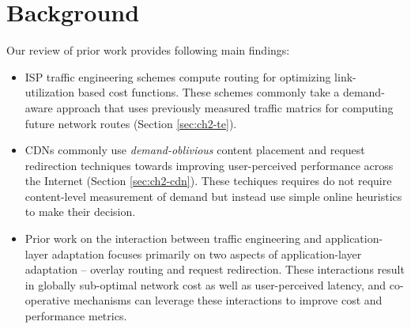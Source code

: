 

\section{Background}
\label{sec:bg-bg}
Our review of prior work provides following main findings:

\begin{itemize}
	\item 
	ISP traffic engineering schemes compute routing for optimizing link-utilization based cost functions. These schemes commonly take a demand-aware approach that uses previously measured traffic matrics for computing future network routes (Section \ref{sec:ch2-te}).	
	\item 
	CDNs commonly use \emph{demand-oblivious} content placement and request redirection techniques towards improving user-perceived performance across the Internet (Section \ref{sec:ch2-cdn}). These techiques requires do not require content-level measurement of demand but instead use simple online heuristics to make their decision.
	\item 
	Prior work on the interaction between traffic engineering and application-layer adaptation focuses primarily on two aspects of application-layer adaptation --  overlay routing and request redirection. These interactions result in globally sub-optimal network cost as well as user-perceived latency, and co-operative mechanisms can leverage these interactions to improve cost and performance metrics.
\end{itemize}


